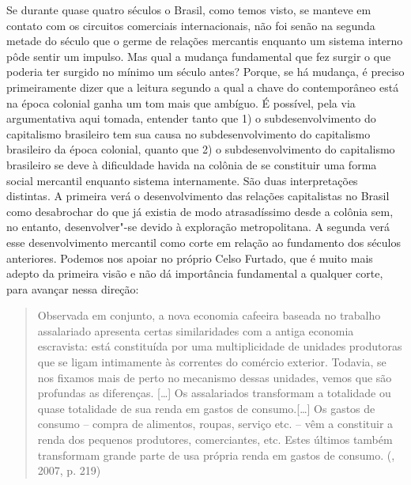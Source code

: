{Se durante quase quatro séculos o Brasil, como temos visto, se manteve
em contato com os circuitos comerciais internacionais, não foi senão na
segunda metade do século  que o germe de relações mercantis enquanto
um sistema interno pôde sentir um impulso. Mas qual a mudança
fundamental que fez surgir o que poderia ter surgido no mínimo um século
antes? Porque, se há mudança, é preciso primeiramente dizer que a
leitura segundo a qual a chave do contemporâneo está na época colonial
ganha um tom mais que ambíguo. É possível, pela via argumentativa aqui
tomada, entender tanto que 1) o subdesenvolvimento do capitalismo
brasileiro tem sua causa no subdesenvolvimento do capitalismo brasileiro
da época colonial, quanto que 2) o subdesenvolvimento do capitalismo
brasileiro se deve à dificuldade havida na colônia de se constituir uma
forma social mercantil enquanto sistema internamente. São duas
interpretações distintas. A primeira verá o desenvolvimento das relações
capitalistas no Brasil como desabrochar do que já existia de modo
atrasadíssimo desde a colônia sem, no entanto, desenvolver"-se devido à
exploração metropolitana. A segunda verá esse desenvolvimento mercantil
como corte em relação ao fundamento dos séculos anteriores. Podemos nos
apoiar no próprio Celso Furtado, que é muito mais adepto da primeira visão e
não dá importância fundamental a qualquer corte, para avançar nessa
direção:

\begin{quote}
Observada em conjunto, a nova economia cafeeira baseada no trabalho
assalariado apresenta certas similaridades com a antiga economia
escravista: está constituída por uma multiplicidade de unidades
produtoras que se ligam intimamente às correntes do comércio exterior.
Todavia, se nos fixamos mais de perto no mecanismo dessas unidades,
vemos que são profundas as diferenças. [\ldots{}] Os assalariados
transformam a totalidade ou quase totalidade de sua renda em gastos de
consumo.[\ldots{}] Os gastos de consumo -- compra de alimentos, roupas,
serviço etc. -- vêm a constituir a renda dos pequenos produtores,
comerciantes, etc. Estes últimos também transformam grande parte de usa
própria renda em gastos de consumo. (, 2007, p. 219)
\end{quote}

}
